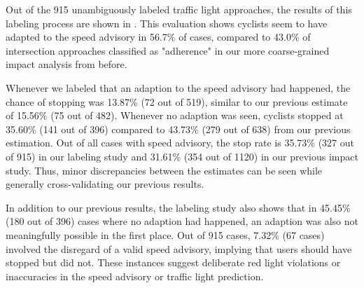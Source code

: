 Out of the 915 unambiguously labeled traffic light approaches, the results of this labeling process are shown in . This evaluation shows cyclists seem to have adapted to the speed advisory in 56.7\% of cases, compared to 43.0\% of intersection approaches classified as "adherence" in our more coarse-grained impact analysis from before. 

Whenever we labeled that an adaption to the speed advisory had happened, the chance of stopping was 13.87\% (72 out of 519), similar to our previous estimate of 15.56\% (75 out of 482). Whenever no adaption was seen, cyclists stopped at 35.60\% (141 out of 396) compared to 43.73\% (279 out of 638) from our previous estimation. Out of all cases with speed advisory, the stop rate is 35.73\% (327 out of 915) in our labeling study and 31.61\% (354 out of 1120) in our previous impact study. Thus, minor discrepancies between the estimates can be seen while generally cross-validating our previous results. 

In addition to our previous results, the labeling study also shows that in 45.45\% (180 out of 396) cases where no adaption had happened, an adaption was also not meaningfully possible in the first place. Out of 915 cases, 7.32\% (67 cases) involved the disregard of a valid speed advisory, implying that users should have stopped but did not. These instances suggest deliberate red light violations or inaccuracies in the speed advisory or traffic light prediction.

